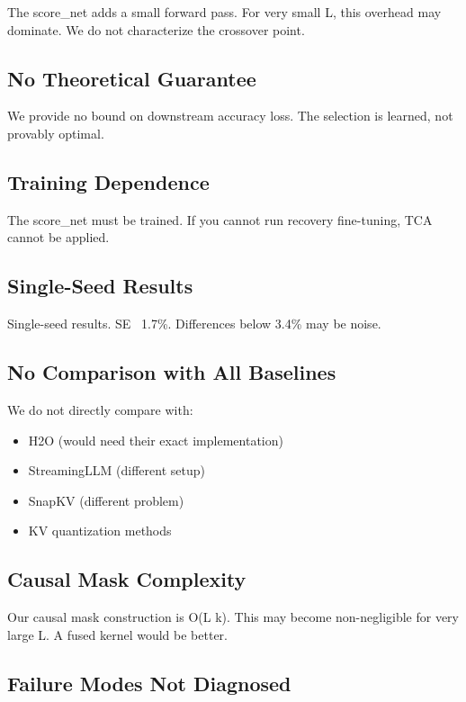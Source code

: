 The score\_net adds a small forward pass. For very small L, this overhead 
may dominate. We do not characterize the crossover point.

\subsection{No Theoretical Guarantee}

We provide no bound on downstream accuracy loss. The selection is learned, 
not provably optimal.

\subsection{Training Dependence}

The score\_net must be trained. If you cannot run recovery fine-tuning, TCA 
cannot be applied.

\subsection{Single-Seed Results}

Single-seed results. SE ~1.7\%. Differences below 3.4\% may be noise.

\subsection{No Comparison with All Baselines}

We do not directly compare with:
\begin{itemize}
\item H2O (would need their exact implementation)
\item StreamingLLM (different setup)
\item SnapKV (different problem)
\item KV quantization methods

\end{itemize}
\subsection{Causal Mask Complexity}

Our causal mask construction is O(L k). This may become non-negligible 
for very large L. A fused kernel would be better.

\subsection{Failure Modes Not Diagnosed}

